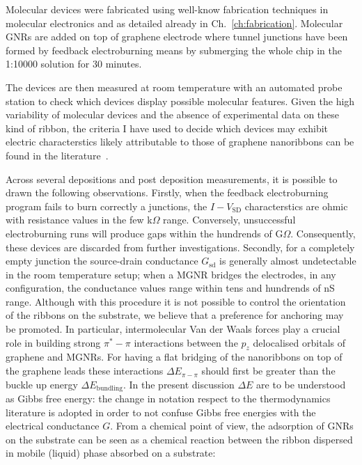 Molecular devices were fabricated using well-know fabrication techniques in molecular electronics and as detailed already in Ch.~\ref{ch:fabrication}. Molecular \glspl{GNR} are added on top of graphene electrode where tunnel junctions have been formed by feedback electroburning means by submerging the whole chip in the 1:10000 solution for 30 minutes.

The devices are then measured at room temperature with an automated probe station to check which devices display possible molecular features. Given the high variability of molecular devices and the absence of experimental data on these kind of ribbon, the criteria I have used to decide which devices may exhibit electric characterstics likely attributable to those of graphene nanoribbons can be found in the literature~\cite{limburg2018anchor, lortscher2007statistical, reus2012statistical}.

Across several depositions and post deposition measurements, it is possible to drawn the following observations.
Firstly, when the feedback electroburning program fails to burn correctly a junctions, the $I-V_\textrm{SD}$ characterstics are ohmic with resistance values in the few k$\Omega$ range. Conversely, unsuccessful electroburning runs will produce gaps within the hundrends of G$\Omega$. Consequently, these devices are discarded from further investigations.
Secondly, for a completely empty junction the source-drain conductance $G_\textrm{sd}$ is generally almost undetectable in the room temperature setup; when a MGNR bridges the electrodes, in any configuration, the conductance values range within tens and hundrends of nS range. Although with this procedure it is not possible to control the orientation of the ribbons on the substrate, we believe that a preference for anchoring may be promoted.
In particular, intermolecular Van der Waals forces play a crucial role in building strong $\pi^*-\pi$ interactions between the $p_z$ delocalised orbitals of graphene and MGNRs. For having a flat bridging of the nanoribbons on top of the graphene leads these interactions $\Delta E_{\pi-\pi}$ should first be greater than the buckle up energy $\Delta E_\textrm{bundling}$. In the present discussion $\Delta E$ are to be understood as Gibbs free energy: the change in notation respect to the thermodynamics literature is adopted in order to not confuse Gibbs free energies with the electrical conductance $G$.
From a chemical point of view, the adsorption of \glspl{GNR} on the substrate can be seen as a chemical reaction between the ribbon dispersed in mobile (liquid) phase absorbed on a substrate:

